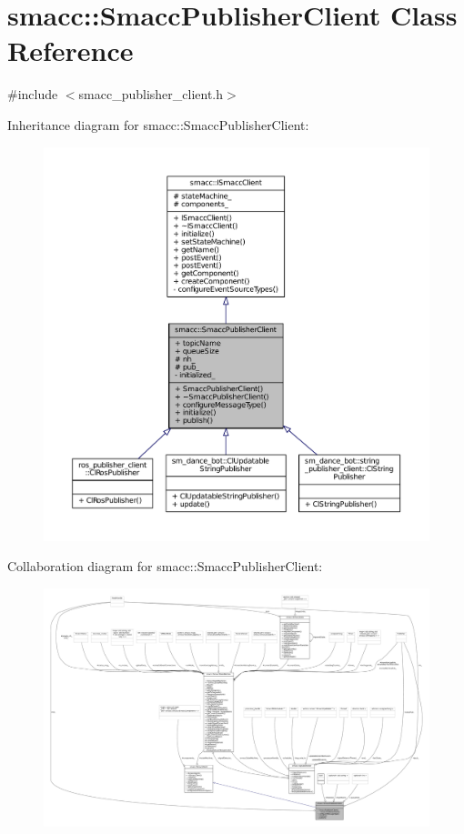 \hypertarget{classsmacc_1_1SmaccPublisherClient}{}\section{smacc\+:\+:Smacc\+Publisher\+Client Class Reference}
\label{classsmacc_1_1SmaccPublisherClient}


{\ttfamily \#include $<$smacc\+\_\+publisher\+\_\+client.\+h$>$}



Inheritance diagram for smacc\+:\+:Smacc\+Publisher\+Client\+:
\nopagebreak
\begin{figure}[H]
\begin{center}
\leavevmode
\includegraphics[width=350pt]{classsmacc_1_1SmaccPublisherClient__inherit__graph}
\end{center}
\end{figure}


Collaboration diagram for smacc\+:\+:Smacc\+Publisher\+Client\+:
\nopagebreak
\begin{figure}[H]
\begin{center}
\leavevmode
\includegraphics[width=350pt]{classsmacc_1_1SmaccPublisherClient__coll__graph}
\end{center}
\end{figure}
